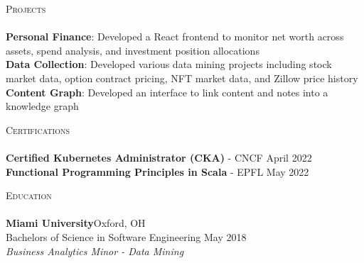 \documentclass[a4paper]{article}
\newcommand{\lineunder} {
    \vspace*{-8pt} \\
    \hspace*{-18pt} \hrulefill \\
}
\newcommand{\header} [1] {
    {\hspace*{-18pt}\vspace*{6pt} \textsc{#1}}
    \vspace*{-6pt} \lineunder
}
\begin{document}
\header{Projects}
{\textbf{Personal Finance}}: Developed a React frontend to monitor net worth across assets, spend analysis, and investment position allocations\\
\vspace*{1mm}
{\textbf{Data Collection}}: Developed various data mining projects including stock market data, option contract pricing, NFT market data, and Zillow price history\\
\vspace*{1mm}
{\textbf{Content Graph}}: Developed an interface to link content and notes into a knowledge graph\\
\vspace*{3mm}

\header{Certifications}
\textbf{Certified Kubernetes Administrator (CKA)} - CNCF \hfill April 2022\\
\vspace*{1mm}
\textbf{Functional Programming Principles in Scala} - EPFL \hfill May 2022\\
\vspace{3mm}

\header{Education}
\textbf{Miami University}\hfill Oxford, OH\\
Bachelors of Science in Software Engineering \hfill May 2018\\
\textit{Business Analytics Minor - Data Mining}\\

\ 
\end{document}
